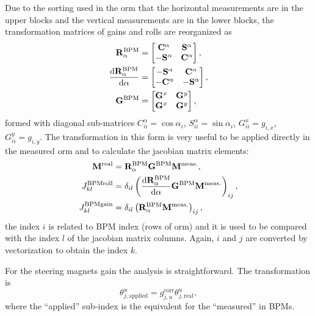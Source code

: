 Due to the sorting used in the \gls{orm} that the horizontal measurements are in the upper blocks and the vertical measurements are in the lower blocks, the transformation matrices of gains and rolls are reorganized as
\begin{align*}
    \mathbf{R}^\mathrm{BPM}_{\alpha} &=
    \begin{bmatrix}
    \mathbf{C}^\alpha &  \mathbf{S}^\alpha \\
     -\mathbf{S}^\alpha & \mathbf{C}^\alpha
    \end{bmatrix}, \\
    \dfrac{\mathrm{d} \mathbf{R}^\mathrm{BPM}_{\alpha}}{\mathrm{d} \alpha} &=
    \begin{bmatrix}
    -\mathbf{S}^\alpha &  \mathbf{C}^\alpha \\
    -\mathbf{C}^\alpha & -\mathbf{S}^\alpha
    \end{bmatrix}, \\
    \mathbf{G}^{\mathrm{BPM}} &=
    \begin{bmatrix}
    \mathbf{G}^x & \mathbf{G}^y \\
    \mathbf{G}^x & \mathbf{G}^y
    \end{bmatrix},
\end{align*}
formed with diagonal sub-matrices ${C}^{\alpha}_{ii} = \cos\alpha_i$, ${S}^{\alpha}_{ii} = \sin\alpha_i$, ${G}^{x}_{ii} = g_{i, x}$, ${G}^{y}_{ii} = g_{i, y}$. The transformation in this form is very useful to be applied directly in the measured \gls{orm} and to calculate the jacobian matrix elements:
\begin{align}
    \mathbf{M}^{\mathrm{real}} &= \mathbf{R}^\mathrm{BPM}_\alpha\mathbf{G}^{\mathrm{BPM}} \mathbf{M}^{\mathrm{meas.}}, \\
    J_{kl}^{\mathrm{BPMroll}} &= \delta_{il}\left(\dfrac{\mathrm{d} \mathbf{R}^\mathrm{BPM}_{\alpha}}{\mathrm{d} \alpha}\mathbf{G}^{\mathrm{BPM}} \mathbf{M}^{\mathrm{meas.}}\right)_{ij}, \\
    J_{kl}^{\mathrm{BPMgain}} &= \delta_{il}\left(\mathbf{R}^\mathrm{BPM}_\alpha \mathbf{M}^{\mathrm{meas.}}\right)_{ij},
\end{align}
the index $i$ is related to BPM index (rows of \gls{orm}) and it is used to be compared with the index $l$ of the jacobian matrix columns. Again, $i$ and $j$ are converted by vectorization to obtain the index $k$.

For the steering magnets gain the analysis is straightforward. The transformation is
\begin{equation}
    \theta_{j, \mathrm{applied}}^u = g_{j, u}^{\mathrm{corr}}\theta_{j, \mathrm{real}}^u,
    \label{eq:app-corr_gain}
\end{equation}
where the ``applied'' sub-index is the equivalent for the ``measured'' in BPMs.

